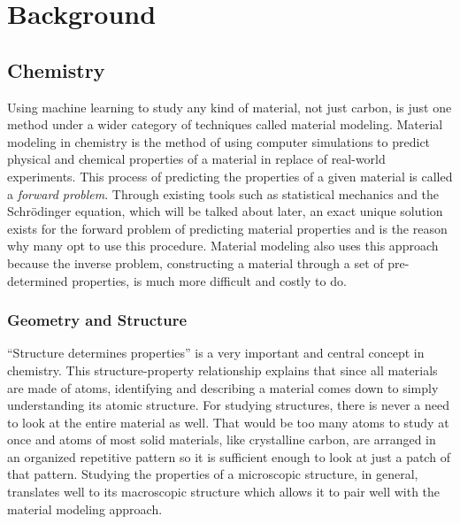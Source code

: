 \documentclass[12pt, abstract = true]{scrartcl}
\begin{document}
\section{Background}

\subsection{Chemistry}

Using machine learning to study any kind of material, not just carbon, 
is just one method under a wider category of techniques called material modeling. 
Material modeling in chemistry is the method of using computer simulations to predict 
physical and chemical properties of a material in replace of real-world experiments. 
This process of predicting the properties of a given material is called a \emph{forward 
problem}. Through existing tools such as statistical mechanics and the Schrödinger 
equation, which will be talked about later, an exact unique solution exists for the 
forward problem of predicting material properties and is the reason why many opt to 
use this procedure. Material modeling also uses this approach because the inverse 
problem, constructing a material through a set of pre-determined properties, 
is much more difficult and costly to do.

\subsubsection{Geometry and Structure}
``Structure determines properties'' is a very important and central concept in chemistry. 
This structure-property relationship explains that since all materials are made of atoms, identifying 
and describing a material comes down to simply understanding its atomic structure. For studying 
structures, there is never a need to look at the entire material as well. That would be too many 
atoms to study at once and atoms of most solid materials, like crystalline carbon, are arranged in 
an organized repetitive pattern so it is sufficient enough to look at just a patch of that pattern. 
Studying the properties of a microscopic structure, in general, translates well to its macroscopic 
structure which allows it to pair well with the material modeling approach.
\end{document}
